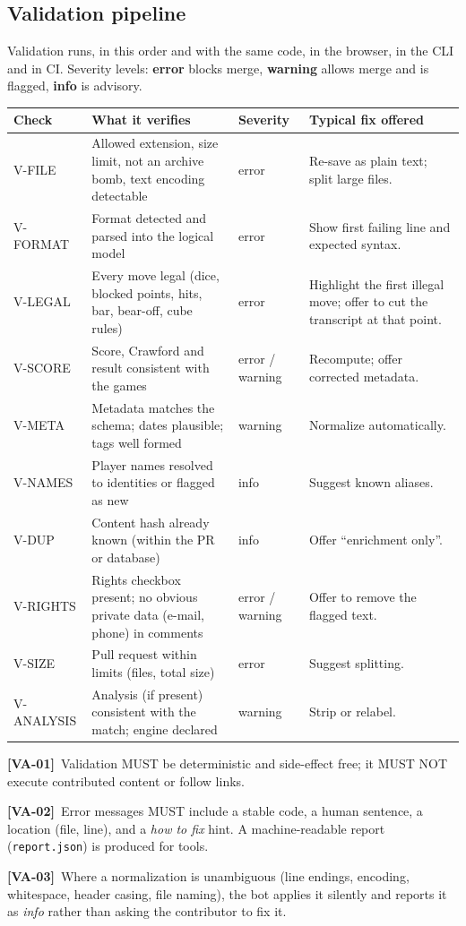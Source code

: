 \documentclass[11pt,a4paper]{article}
\newcommand{\req}[2]{\par\smallskip\noindent\hypertarget{#1}{}\textbf{[#1]}\ #2\par}
\begin{document}
\subsection{Validation pipeline}\label{sec:validation}
Validation runs, in this order and with the same code, in the browser, in the CLI and in CI. Severity levels: \textbf{error} blocks merge, \textbf{warning} allows merge and is flagged, \textbf{info} is advisory.
\begin{longtable}{@{}p{1.7cm}p{5.0cm}p{1.6cm}p{5.5cm}@{}}
\toprule
\textbf{Check} & \textbf{What it verifies} & \textbf{Severity} & \textbf{Typical fix offered}\\
\midrule
\endhead
V-FILE & Allowed extension, size limit, not an archive bomb, text encoding detectable & error & Re-save as plain text; split large files.\\
V-FORMAT & Format detected and parsed into the logical model & error & Show first failing line and expected syntax.\\
V-LEGAL & Every move legal (dice, blocked points, hits, bar, bear-off, cube rules) & error & Highlight the first illegal move; offer to cut the transcript at that point.\\
V-SCORE & Score, Crawford and result consistent with the games & error / warning & Recompute; offer corrected metadata.\\
V-META & Metadata matches the schema; dates plausible; tags well formed & warning & Normalize automatically.\\
V-NAMES & Player names resolved to identities or flagged as new & info & Suggest known aliases.\\
V-DUP & Content hash already known (within the PR or database) & info & Offer ``enrichment only''.\\
V-RIGHTS & Rights checkbox present; no obvious private data (e-mail, phone) in comments & error / warning & Offer to remove the flagged text.\\
V-SIZE & Pull request within limits (files, total size) & error & Suggest splitting.\\
V-ANALYSIS & Analysis (if present) consistent with the match; engine declared & warning & Strip or relabel.\\
\bottomrule
\end{longtable}
\req{VA-01}{Validation MUST be deterministic and side-effect free; it MUST NOT execute contributed content or follow links.}
\req{VA-02}{Error messages MUST include a stable code, a human sentence, a location (file, line), and a \emph{how to fix} hint. A machine-readable report (\texttt{report.json}) is produced for tools.}
\req{VA-03}{Where a normalization is unambiguous (line endings, encoding, whitespace, header casing, file naming), the bot applies it silently and reports it as \emph{info} rather than asking the contributor to fix it.}
\end{document}
